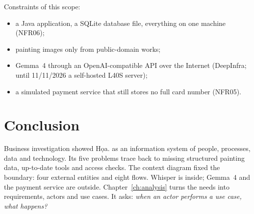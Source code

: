 Constraints of this scope:
\begin{itemize}
\item a Java application, a SQLite database file, everything on one machine (NFR06);
\item painting images only from public-domain works;
\item Gemma~4 through an OpenAI-compatible API over the Internet (DeepInfra; until 11/11/2026 a self-hosted L40S
      server);
\item a simulated payment service that still stores no full card number (NFR05).
\end{itemize}

\section{Conclusion}\label{sec:1.13}

Business investigation showed Họa. as an information system of people, processes, data and technology. Its five
problems trace back to missing structured painting data, up-to-date tools and access checks. The context diagram
fixed the boundary: four external entities and eight flows. Whisper is inside; Gemma~4 and the payment service are
outside. Chapter~\ref{ch:analysis} turns the needs into requirements, actors and use cases. It asks: \emph{when an
actor performs a use case, what happens?}
